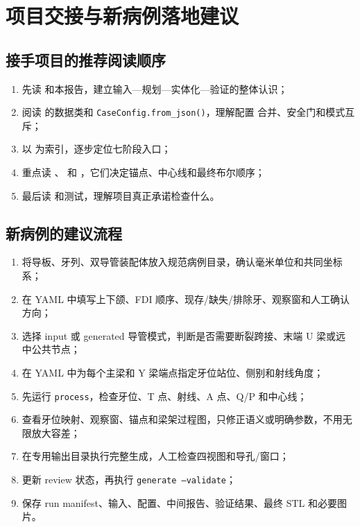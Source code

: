 \chapter{项目交接与新病例落地建议}

\section{接手项目的推荐阅读顺序}

\begin{enumerate}
  \item 先读  和本报告，建立输入—规划—实体化—验证的整体认识；
  \item 阅读  的数据类和 \texttt{CaseConfig.from\_json()}，理解配置
  合并、安全门和模式互斥；
  \item 以  为索引，逐步定位七阶段入口；
  \item 重点读 、 和
  ，它们决定锚点、中心线和最终布尔顺序；
  \item 最后读  和测试，理解项目真正承诺检查什么。
\end{enumerate}

\section{新病例的建议流程}

\begin{enumerate}
  \item 将导板、牙列、双导管装配体放入规范病例目录，确认毫米单位和共同坐标系；
  \item 在 YAML 中填写上下颌、FDI 顺序、现存/缺失/排除牙、观察窗和人工确认方向；
  \item 选择 input 或 generated 导管模式，判断是否需要断裂跨接、末端 U 梁或远中公共节点；
  \item 在 YAML 中为每个主梁和 Y 梁端点指定牙位站位、侧别和射线角度；
  \item 先运行 \texttt{process}，检查牙位、T 点、射线、A 点、Q/P 和中心线；
  \item 查看牙位映射、观察窗、锚点和梁架过程图，只修正语义或明确参数，不用无限放大容差；
  \item 在专用输出目录执行完整生成，人工检查四视图和导孔/窗口；
  \item 更新 review 状态，再执行 \texttt{generate --validate}；
  \item 保存 run manifest、输入、配置、中间报告、验证结果、最终 STL 和必要图片。
\end{enumerate}

